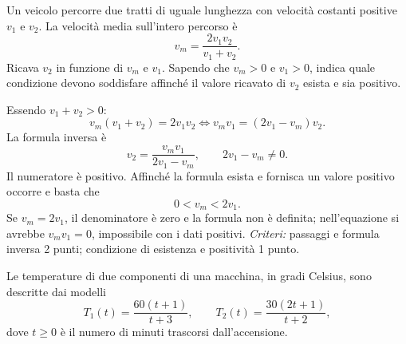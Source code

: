 \documentclass[11pt,a4paper,addpoints]{exam}
\newcommand{\obiettivocorrente}{}
\newcommand{\obiettivo}[1]{%
  \gdef\obiettivocorrente{#1}%
}
\gdef\obiettivocorrente{}%
\newcounter{offsetfila}
\newenvironment{esercizi}
  {%
    \begin{questions}
    \setcounter{question}{\value{offsetfila}}%
  }
  {\end{questions}}
\newenvironment{esercizio}
  {%
    \par
    \ifprintanswers\else\begin{samepage}\fi
  }
  {%
    \ifprintanswers\else\end{samepage}\fi
    \par\vspace{3pt}
  }
\begin{document}
\begin{esercizi}
\begin{esercizio}
\end{esercizio}

\begin{esercizio}
\obiettivo{ricavare una formula inversa}
\question[3]
Un veicolo percorre due tratti di uguale lunghezza con velocità
costanti positive $v_1$ e $v_2$.
La velocità media sull'intero percorso è
\[
v_m=\frac{2v_1v_2}{v_1+v_2}.
\]
Ricava $v_2$ in funzione di $v_m$ e $v_1$.
Sapendo che $v_m>0$ e $v_1>0$, indica quale condizione
devono soddisfare affinché il valore ricavato di $v_2$
esista e sia positivo.
\begin{solution}
Essendo $v_1+v_2>0$:
\[
v_m(v_1+v_2)=2v_1v_2
\iff v_mv_1=(2v_1-v_m)v_2.
\]
La formula inversa è
\[
\boxed{v_2=\frac{v_mv_1}{2v_1-v_m}},
\qquad 2v_1-v_m\ne0.
\]
Il numeratore è positivo. Affinché la formula esista e
fornisca un valore positivo occorre e basta che
\[
\boxed{0<v_m<2v_1}.
\]
Se $v_m=2v_1$, il denominatore è zero e la formula non è definita;
nell'equazione si avrebbe $v_mv_1=0$, impossibile con i dati positivi.
\textit{Criteri:} passaggi e formula inversa 2 punti;
condizione di esistenza e positività 1 punto.
\end{solution}
\end{esercizio}

\begin{esercizio}
\obiettivo{interpretare e confrontare modelli frazionari}
\question
Le temperature di due componenti di una macchina, in gradi Celsius,
sono descritte dai modelli
\[
T_1(t)=\frac{60(t+1)}{t+3},
\qquad T_2(t)=\frac{30(2t+1)}{t+2},
\]
dove $t\ge0$ è il numero di minuti trascorsi dall'accensione.
\begin{parts}

\end{parts}
\end{esercizio}
\end{esercizi}
\end{document}
